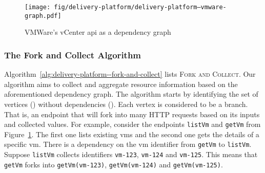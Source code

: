 \begin{figure}[h]
	\centering
	\texttt{[image: fig/delivery-platform/delivery-platform--vmware-graph.pdf]}
	\caption{VMWare's vCenter \gls{api} as a dependency graph}
	\label{fig:delivery-platform--vmware-graph}
\end{figure}

\subsubsection{The Fork and Collect Algorithm}
\label{subsubsect:delivery-platform--fork-and-collect-algorithm}

Algorithm~\ref{alg:delivery-platform--fork-and-collect} lists \textsc{Fork and Collect}. Our algorithm aims to collect and aggregate resource information based on the aforementioned dependency graph. The algorithm starts by identifying the set of vertices () without dependencies (). Each vertex is considered to be a branch. That is, an endpoint that will fork into many HTTP requests based on its inputs and collected values. For example, consider the endpoints \texttt{listVm} and \texttt{getVm} from Figure~\ref{fig:delivery-platform--vmware-graph}. The first one lists existing \glspl{vm} and the second one gets the details of a specific \gls{vm}. There is a dependency on the \gls{vm} identifier from \texttt{getVm} to \texttt{listVm}. Suppose \texttt{listVm} collects identifiers \texttt{vm-123}, \texttt{vm-124} and \texttt{vm-125}. This means that \texttt{getVm} forks into \texttt{getVm(vm-123)}, \texttt{getVm(vm-124)} and \texttt{getVm(vm-125)}.

